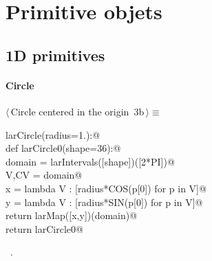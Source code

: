 \documentclass[11pt,oneside]{article}	%
\begin{document}
\section{Primitive objets}
\subsection{1D primitives}

\paragraph{Circle}
\begin{flushleft} \small \label{scrap5}
\protect{}$\langle\,$Circle centered in the origin\nobreak\ {\footnotesize 3b}$\,\rangle\equiv$
\vspace{-1ex}
\begin{list}{}{} \item
\mbox{}\verb@def larCircle(radius=1.):@\\
\mbox{}\verb@   def larCircle0(shape=36):@\\
\mbox{}\verb@      domain = larIntervals([shape])([2*PI])@\\
\mbox{}\verb@      V,CV = domain@\\
\mbox{}\verb@      x = lambda V : [radius*COS(p[0]) for p in V]@\\
\mbox{}\verb@      y = lambda V : [radius*SIN(p[0]) for p in V]@\\
\mbox{}\verb@      return larMap([x,y])(domain)@\\
\mbox{}\verb@   return larCircle0@\\
\mbox{}\verb@@{\NWsep}
\end{list}
\vspace{-1ex}
\footnotesize\addtolength{\baselineskip}{-1ex}
\begin{list}{}{\setlength{\itemsep}{-\parsep}\setlength{\itemindent}{-\leftmargin}}
\item \NWtxtMacroRefIn\ .
\end{list}
\end{flushleft}
\end{document}
